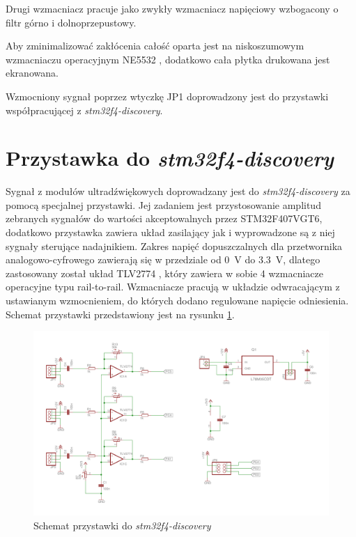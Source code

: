 Drugi wzmacniacz pracuje jako zwykły wzmacniacz napięciowy wzbogacony o filtr górno i dolnoprzepustowy.

Aby zminimalizować zakłócenia całość oparta jest na niskoszumowym wzmacniaczu operacyjnym NE5532 \cite{bib:ne5532}, 
dodatkowo cała płytka drukowana jest ekranowana.

Wzmocniony sygnał poprzez wtyczkę JP1 doprowadzony jest do przystawki współpracującej z \textit{stm32f4-discovery}.

\clearpage

\section{Przystawka do \textit{stm32f4-discovery}}

Sygnał z modułów ultradźwiękowych doprowadzany jest do \textit{stm32f4-discovery} za pomocą specjalnej przystawki.
Jej zadaniem jest przystosowanie amplitud zebranych sygnałów do wartości akceptowalnych przez STM32F407VGT6,
dodatkowo przystawka zawiera układ zasilający jak i wyprowadzone są z niej sygnały sterujące nadajnikiem.
Zakres napięć dopuszczalnych dla przetwornika analogowo-cyfrowego zawierają się w przedziale od \SI{0}{V} do \SI{3,3}{V},
dlatego zastosowany został układ TLV2774 \cite{bib:TLV2774}, który zawiera w sobie 4 wzmacniacze operacyjne typu
rail-to-rail. Wzmacniacze pracują w układzie odwracającym z ustawianym wzmocnieniem, do których dodano regulowane napięcie odniesienia.
Schemat przystawki przedstawiony jest na rysunku \ref{fig:przystawka}.



 \begin{figure}[h!]
    \centering
    \includegraphics[width=1\textwidth, trim= 5mm 0mm 0mm 0mm,clip]{mainboard2}
    \caption{Schemat przystawki do \textit{stm32f4-discovery}}
    \label{fig:przystawka}
\end{figure}



